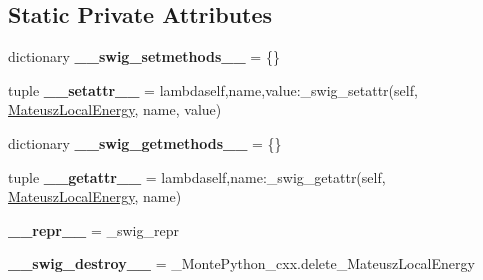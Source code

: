 \subsection*{Static Private Attributes}
\begin{DoxyCompactItemize}
\item 
\hypertarget{classMontePython__cxx_1_1MateuszLocalEnergy_a49a48dbcc19b52271babd78ad16de26c}{}dictionary {\bfseries \+\_\+\+\_\+swig\+\_\+setmethods\+\_\+\+\_\+} = \{\}\label{classMontePython__cxx_1_1MateuszLocalEnergy_a49a48dbcc19b52271babd78ad16de26c}

\item 
\hypertarget{classMontePython__cxx_1_1MateuszLocalEnergy_ad8c324d7e4e72e4fa33b3b7c1ec1ff99}{}tuple {\bfseries \+\_\+\+\_\+setattr\+\_\+\+\_\+} = lambdaself,name,value\+:\+\_\+swig\+\_\+setattr(self, \hyperlink{classMontePython__cxx_1_1MateuszLocalEnergy}{Mateusz\+Local\+Energy}, name, value)\label{classMontePython__cxx_1_1MateuszLocalEnergy_ad8c324d7e4e72e4fa33b3b7c1ec1ff99}

\item 
\hypertarget{classMontePython__cxx_1_1MateuszLocalEnergy_ac0189d8c162305bf0fb6568b19eebdf5}{}dictionary {\bfseries \+\_\+\+\_\+swig\+\_\+getmethods\+\_\+\+\_\+} = \{\}\label{classMontePython__cxx_1_1MateuszLocalEnergy_ac0189d8c162305bf0fb6568b19eebdf5}

\item 
\hypertarget{classMontePython__cxx_1_1MateuszLocalEnergy_aa9fac2867a0f407a89002a1641f158e5}{}tuple {\bfseries \+\_\+\+\_\+getattr\+\_\+\+\_\+} = lambdaself,name\+:\+\_\+swig\+\_\+getattr(self, \hyperlink{classMontePython__cxx_1_1MateuszLocalEnergy}{Mateusz\+Local\+Energy}, name)\label{classMontePython__cxx_1_1MateuszLocalEnergy_aa9fac2867a0f407a89002a1641f158e5}

\item 
\hypertarget{classMontePython__cxx_1_1MateuszLocalEnergy_afcfac0f89b9f8a59f88a76b2933eb6ca}{}{\bfseries \+\_\+\+\_\+repr\+\_\+\+\_\+} = \+\_\+swig\+\_\+repr\label{classMontePython__cxx_1_1MateuszLocalEnergy_afcfac0f89b9f8a59f88a76b2933eb6ca}

\item 
\hypertarget{classMontePython__cxx_1_1MateuszLocalEnergy_a88b3341c43ab2bd32ecb447e7e82e9de}{}{\bfseries \+\_\+\+\_\+swig\+\_\+destroy\+\_\+\+\_\+} = \+\_\+\+Monte\+Python\+\_\+cxx.\+delete\+\_\+\+Mateusz\+Local\+Energy\label{classMontePython__cxx_1_1MateuszLocalEnergy_a88b3341c43ab2bd32ecb447e7e82e9de}

\end{DoxyCompactItemize}


